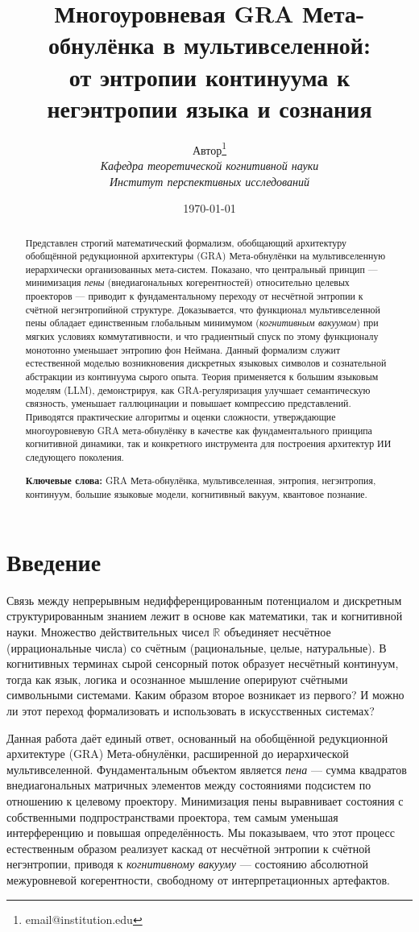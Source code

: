 \documentclass[11pt]{article}
\title{Многоуровневая GRA Мета-обнулёнка в мультивселенной: \\
от энтропии континуума к негэнтропии языка и сознания}
\author{Автор\thanks{email@institution.edu} \\
\textit{Кафедра теоретической когнитивной науки} \\
\textit{Институт перспективных исследований}}
\date{\today}
\begin{document}
\maketitle

\begin{abstract}
Представлен строгий математический формализм, обобщающий архитектуру обобщённой редукционной архитектуры (GRA) Мета-обнулёнки на мультивселенную иерархически организованных мета-систем. Показано, что центральный принцип --- минимизация \emph{пены} (внедиагональных когерентностей) относительно целевых проекторов --- приводит к фундаментальному переходу от несчётной энтропии к счётной негэнтропийной структуре. Доказывается, что функционал мультивселенной пены обладает единственным глобальным минимумом (\emph{когнитивным вакуумом}) при мягких условиях коммутативности, и что градиентный спуск по этому функционалу монотонно уменьшает энтропию фон Неймана. Данный формализм служит естественной моделью возникновения дискретных языковых символов и сознательной абстракции из континуума сырого опыта. Теория применяется к большим языковым моделям (LLM), демонстрируя, как GRA-регуляризация улучшает семантическую связность, уменьшает галлюцинации и повышает компрессию представлений. Приводятся практические алгоритмы и оценки сложности, утверждающие многоуровневую GRA мета-обнулёнку в качестве как фундаментального принципа когнитивной динамики, так и конкретного инструмента для построения архитектур ИИ следующего поколения.

\textbf{Ключевые слова:} GRA Мета-обнулёнка, мультивселенная, энтропия, негэнтропия, континуум, большие языковые модели, когнитивный вакуум, квантовое познание.
\end{abstract}

\section{Введение}
Связь между непрерывным недифференцированным потенциалом и дискретным структурированным знанием лежит в основе как математики, так и когнитивной науки. Множество действительных чисел $\mathbb{R}$ объединяет несчётное (иррациональные числа) со счётным (рациональные, целые, натуральные). В когнитивных терминах сырой сенсорный поток образует несчётный континуум, тогда как язык, логика и осознанное мышление оперируют счётными символьными системами. Каким образом второе возникает из первого? И можно ли этот переход формализовать и использовать в искусственных системах?

Данная работа даёт единый ответ, основанный на обобщённой редукционной архитектуре (GRA) Мета-обнулёнки, расширенной до иерархической мультивселенной. Фундаментальным объектом является \emph{пена} --- сумма квадратов внедиагональных матричных элементов между состояниями подсистем по отношению к целевому проектору. Минимизация пены выравнивает состояния с собственными подпространствами проектора, тем самым уменьшая интерференцию и повышая определённость. Мы показываем, что этот процесс естественным образом реализует каскад от несчётной энтропии к счётной негэнтропии, приводя к \emph{когнитивному вакууму} --- состоянию абсолютной межуровневой когерентности, свободному от интерпретационных артефактов.
\end{document}
